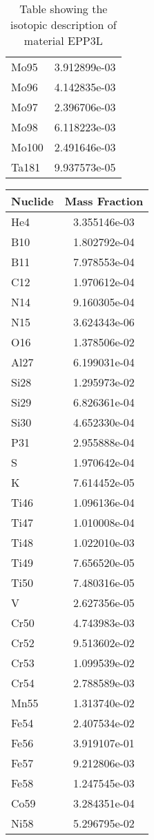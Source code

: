\begin{centering}
\begin{table}[ht!]
\begin{tabular}{l | c}
Mo95 & 3.912899e-03\\
Mo96 & 4.142835e-03\\
Mo97 & 2.396706e-03\\
Mo98 & 6.118223e-03\\
Mo100 & 2.491646e-03\\
Ta181 & 9.937573e-05
\end{tabular}
\caption{Table showing the isotopic description of material EPP3L}
\label{table:material_EPP3L}
\end{table}
\clearpage
\begin{table}[ht!]
\begin{tabular}{l | c}
\hline
Nuclide & Mass Fraction\\
\hline
He4 & 3.355146e-03\\
B10 & 1.802792e-04\\
B11 & 7.978553e-04\\
C12 & 1.970612e-04\\
N14 & 9.160305e-04\\
N15 & 3.624343e-06\\
O16 & 1.378506e-02\\
Al27 & 6.199031e-04\\
Si28 & 1.295973e-02\\
Si29 & 6.826361e-04\\
Si30 & 4.652330e-04\\
P31 & 2.955888e-04\\
S & 1.970642e-04\\
K & 7.614452e-05\\
Ti46 & 1.096136e-04\\
Ti47 & 1.010008e-04\\
Ti48 & 1.022010e-03\\
Ti49 & 7.656520e-05\\
Ti50 & 7.480316e-05\\
V & 2.627356e-05\\
Cr50 & 4.743983e-03\\
Cr52 & 9.513602e-02\\
Cr53 & 1.099539e-02\\
Cr54 & 2.788589e-03\\
Mn55 & 1.313740e-02\\
Fe54 & 2.407534e-02\\
Fe56 & 3.919107e-01\\
Fe57 & 9.212806e-03\\
Fe58 & 1.247545e-03\\
Co59 & 3.284351e-04\\
Ni58 & 5.296795e-02\\

\end{tabular}
\end{table}
\end{centering}
